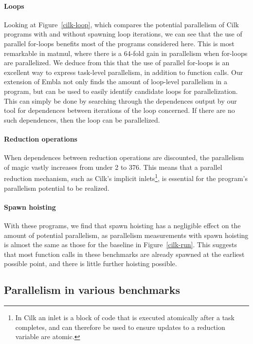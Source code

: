 \paragraph{Loops}

Looking at Figure~\ref{cilk-loop}, which compares the potential parallelism of Cilk programs with and without spawning loop iterations, we can see that the use of parallel for-loops benefits most of the programs considered here.
This is most remarkable in \textsf{matmul}, where there is a 64-fold gain in parallelism when for-loops are parallelized.
We deduce from this that the use of parallel for-loops is an excellent way to express task-level parallelism, in addition to function calls.
Our extension of Embla not only finds the amount of loop-level parallelism in a program, but can be used to easily identify candidate loops for parallelization.
This can simply be done by searching through the dependences output by our tool for dependences between iterations of the loop concerned.
If there are no such dependences, then the loop can be parallelized.

\paragraph{Reduction operations}

When dependences between reduction operations are discounted,
the parallelism of \textsf{magic} vastly increases from under 2 to 376.
This means that a parallel reduction mechanism, such as Cilk's implicit inlets\footnote{In Cilk an inlet is a block of code that is executed atomically after a task completes, and can therefore be used to ensure updates to a reduction variable are atomic.},
is essential for the program's parallelism potential to be realized.

\paragraph{Spawn hoisting}

With these programs, we find that spawn hoisting has a negligible effect on the amount of potential parallelism, as parallelism measurements with spawn hoisting is almost the same as those for the baseline in Figure~\ref{cilk-run}.
This suggests that most function calls in these benchmarks are already spawned at the earliest possible point, and there is little further hoisting possible.

\subsection{Parallelism in various benchmarks} \label{sresults:benchmarks}

